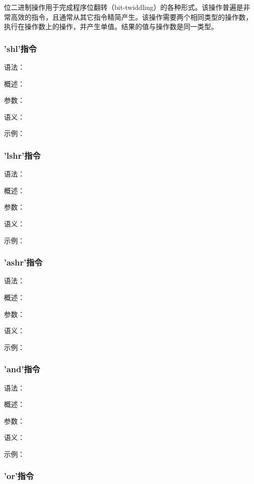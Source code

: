 \documentclass[12pt,a4paper]{article}
\begin{document}
{位二进制操作用于完成程序位翻转（bit-twiddling）的各种形式。该操作普遍是非常高效的指令，且通常从其它指令精简产生。该操作需要两个相同类型的操作数，执行在操作数上的操作，并产生单值。结果的值与操作数是同一类型。

\subsubsection{'shl'指令} %

语法：

概述：

参数：

语义：

示例：


\subsubsection{'lshr'指令} %

语法：

概述：

参数：

语义：

示例：


\subsubsection{'ashr'指令} %

语法：

概述：

参数：

语义：

示例：


\subsubsection{'and'指令} %

语法：

概述：

参数：

语义：

示例：


\subsubsection{'or'指令} %

}
\end{document}
